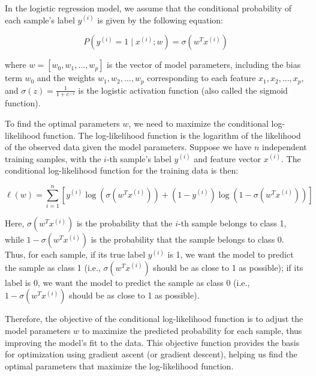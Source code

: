 \documentclass[a4paper, utf8]{ctexart}
\begin{document}
	In the logistic regression model, we assume that the conditional probability of each sample's label $ y^{(i)} $ is given by the following equation:
	
	\vspace{-.5em}
	\begin{equation}
		P(y^{(i)} = 1 \mid x^{(i)}; w) = \sigma(w^T x^{(i)})
		\nonumber
	\end{equation}
	
	where $ w = [w_0, w_1, \dots, w_p] $ is the vector of model parameters, including the bias term $ w_0 $ and the weights $ w_1, w_2, \dots, w_p $ corresponding to each feature $ x_1, x_2, \dots, x_p $, and $ \sigma(z) = \frac{1}{1 + e^{-z}} $ is the logistic activation function (also called the sigmoid function).
	
	To find the optimal parameters $ w $, we need to maximize the conditional log-likelihood function. The log-likelihood function is the logarithm of the likelihood of the observed data given the model parameters. Suppose we have $ n $ independent training samples, with the $ i $-th sample's label $ y^{(i)} $ and feature vector $ x^{(i)} $. The conditional log-likelihood function for the training data is then:
	
	\vspace{-.5em}
	\begin{equation}
		\ell(w) = \sum_{i=1}^{n} \left[ y^{(i)} \log(\sigma(w^T x^{(i)})) + (1 - y^{(i)}) \log(1 - \sigma(w^T x^{(i)})) \right]
		\nonumber
	\end{equation}
	
	Here, $ \sigma(w^T x^{(i)}) $ is the probability that the $ i $-th sample belongs to class 1, while $ 1 - \sigma(w^T x^{(i)}) $ is the probability that the sample belongs to class 0. Thus, for each sample, if its true label $ y^{(i)} $ is 1, we want the model to predict the sample as class 1 (i.e., $ \sigma(w^T x^{(i)}) $ should be as close to 1 as possible); if its label is 0, we want the model to predict the sample as class 0 (i.e., $ 1 - \sigma(w^T x^{(i)}) $ should be as close to 1 as possible).
	
	Therefore, the objective of the conditional log-likelihood function is to adjust the model parameters $ w $ to maximize the predicted probability for each sample, thus improving the model's fit to the data. This objective function provides the basis for optimization using gradient ascent (or gradient descent), helping us find the optimal parameters that maximize the log-likelihood function.
	
\end{document}
